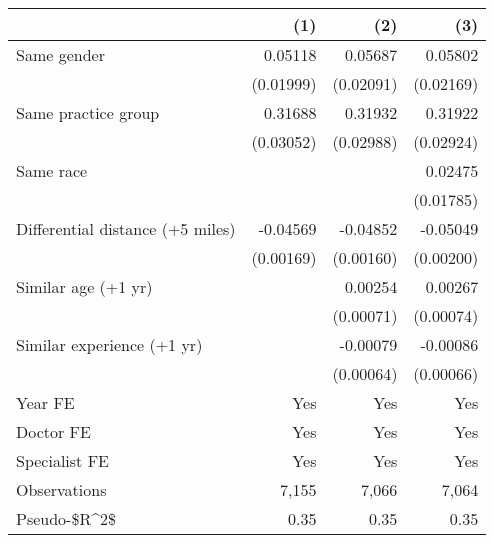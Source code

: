 \begin{table}[!h]
\centering
\begin{tabular}{lrrr}
\toprule
 & (1) & (2) & (3)\\
\midrule
Same gender & 0.05118 & 0.05687 & 0.05802\\
 & (0.01999) & (0.02091) & (0.02169)\\
Same practice group & 0.31688 & 0.31932 & 0.31922\\
 & (0.03052) & (0.02988) & (0.02924)\\
Same race &  &  & 0.02475\\
\addlinespace
 &  &  & (0.01785)\\
Differential distance (+5 miles) & -0.04569 & -0.04852 & -0.05049\\
 & (0.00169) & (0.00160) & (0.00200)\\
Similar age (+1 yr) &  & 0.00254 & 0.00267\\
 &  & (0.00071) & (0.00074)\\
\addlinespace
Similar experience (+1 yr) &  & -0.00079 & -0.00086\\
 &  & (0.00064) & (0.00066)\\
Year FE & Yes & Yes & Yes\\
Doctor FE & Yes & Yes & Yes\\
Specialist FE & Yes & Yes & Yes\\
\addlinespace
Observations & 7,155 & 7,066 & 7,064\\
Pseudo-\$R\textasciicircum{}2\$ & 0.35 & 0.35 & 0.35\\
\bottomrule
\end{tabular}
\end{table}
